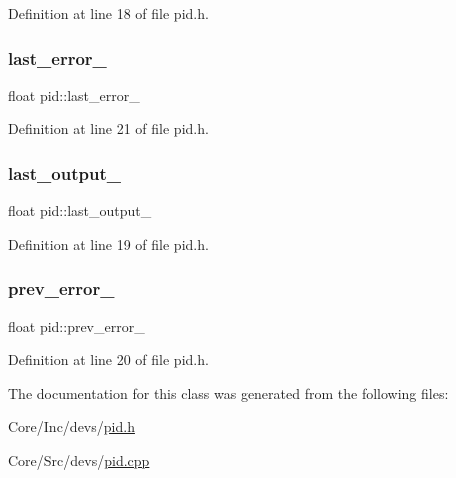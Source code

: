 Definition at line 18 of file pid.\+h.

\mbox{\label{classpid_a2d3bd1202a5869a7c16fca68e22bd045}} 
\subsubsection{\texorpdfstring{last\_error\_}{last\_error\_}}
{\footnotesize\ttfamily float pid\+::last\+\_\+error\+\_\+\hspace{0.3cm}{\ttfamily [private]}}



Definition at line 21 of file pid.\+h.

\mbox{\label{classpid_ae4599d4ab41474f8606a7c4e661b369f}} 
\subsubsection{\texorpdfstring{last\_output\_}{last\_output\_}}
{\footnotesize\ttfamily float pid\+::last\+\_\+output\+\_\+\hspace{0.3cm}{\ttfamily [private]}}



Definition at line 19 of file pid.\+h.

\mbox{\label{classpid_a5d0151f1efff3c3963068809c3f92fbc}} 
\subsubsection{\texorpdfstring{prev\_error\_}{prev\_error\_}}
{\footnotesize\ttfamily float pid\+::prev\+\_\+error\+\_\+\hspace{0.3cm}{\ttfamily [private]}}



Definition at line 20 of file pid.\+h.



The documentation for this class was generated from the following files\+:\begin{DoxyCompactItemize}
\item 
Core/\+Inc/devs/\mbox{\hyperlink{pid_8h}{pid.\+h}}\item 
Core/\+Src/devs/\mbox{\hyperlink{pid_8cpp}{pid.\+cpp}}\end{DoxyCompactItemize}
